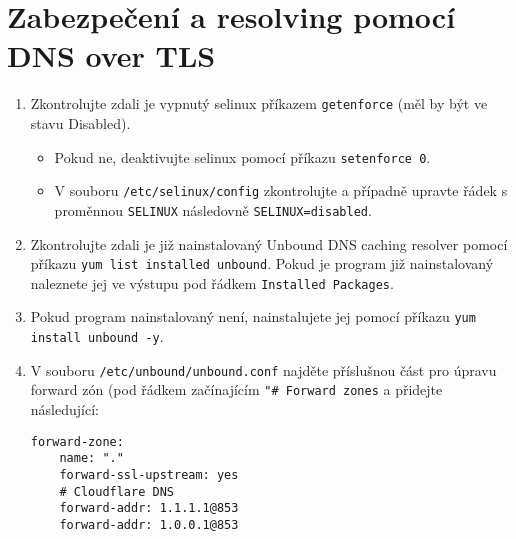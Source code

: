 \section{Zabezpečení a resolving pomocí DNS over TLS}
\label{sec:dot}
\begin{enumerate}
    \item Zkontrolujte zdali je vypnutý selinux příkazem \texttt{getenforce} (měl by být ve stavu Disabled).
    \begin{itemize}
        \item Pokud ne, deaktivujte selinux pomocí příkazu \texttt{setenforce 0}.
        \item V souboru \texttt{/etc/selinux/config} zkontrolujte a případně upravte řádek s proměnnou \texttt{SELINUX} následovně \texttt{SELINUX=disabled}.
    \end{itemize}
    \item Zkontrolujte zdali je již nainstalovaný Unbound DNS caching resolver pomocí příkazu \texttt{yum list installed unbound}. Pokud je program již nainstalovaný naleznete jej ve výstupu pod řádkem \texttt{Installed Packages}.
    \item Pokud program nainstalovaný není, nainstalujete jej pomocí příkazu \texttt{yum install unbound -y}.
    \item V souboru \texttt{/etc/unbound/unbound.conf} najděte příslušnou část pro úpravu forward zón (pod řádkem začínajícím \texttt{"\# Forward zones} a přidejte následující:
    
\begin{verbatim}
forward-zone:
    name: "."
    forward-ssl-upstream: yes
    # Cloudflare DNS
    forward-addr: 1.1.1.1@853
    forward-addr: 1.0.0.1@853
\end{verbatim}


\end{enumerate}

